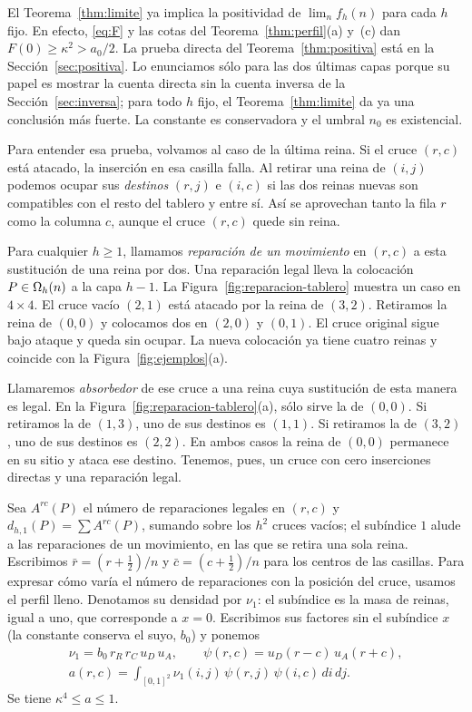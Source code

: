 El Teorema~\ref{thm:limite} ya implica la positividad de $\lim_nf_h(n)$ para cada $h$ fijo.
En efecto, \eqref{eq:F} y las cotas del Teorema~\ref{thm:perfil}(a) y~(c) dan
$F(0)\ge\kappa^2>a_0/2$. La prueba directa del Teorema~\ref{thm:positiva} está en la
Sección~\ref{sec:positiva}. Lo enunciamos sólo para las dos últimas capas porque su papel es
mostrar la cuenta directa sin la cuenta inversa de la Sección~\ref{sec:inversa}; para todo $h$
fijo, el Teorema~\ref{thm:limite} da ya una conclusión más fuerte. La constante es conservadora y el
umbral $n_0$ es existencial.

Para entender esa prueba, volvamos al caso de la última reina. Si el cruce
$(r,c)$ está atacado, la inserción en esa casilla falla. Al retirar
una reina de $(i,j)$ podemos ocupar sus \emph{destinos} $(r,j)$ e $(i,c)$ si las dos reinas nuevas son
compatibles con el resto del tablero y entre sí.
Así se aprovechan tanto la fila $r$ como la columna $c$, aunque el cruce $(r,c)$
quede sin reina.

Para cualquier $h\ge1$, llamamos \emph{reparación de un movimiento} en $(r,c)$
a esta sustitución de una reina por dos. Una reparación legal lleva la colocación
$P\in\Omega_h(n)$ a la capa $h-1$. La Figura~\ref{fig:reparacion-tablero}
muestra un caso en $4\times4$. El cruce vacío $(2,1)$ está atacado por la reina
de $(3,2)$. Retiramos la reina de $(0,0)$ y colocamos dos en $(2,0)$ y $(0,1)$.
El cruce original sigue bajo ataque y queda sin ocupar. La nueva colocación ya
tiene cuatro reinas y coincide con la Figura~\ref{fig:ejemplos}(a).



Llamaremos \emph{absorbedor} de ese cruce a una reina cuya sustitución
de esta manera es legal. En la Figura~\ref{fig:reparacion-tablero}(a), sólo
sirve la de $(0,0)$. Si retiramos la de $(1,3)$, uno de sus destinos es $(1,1)$.
Si retiramos la de $(3,2)$, uno de sus destinos es $(2,2)$. En ambos casos la
reina de $(0,0)$ permanece en su sitio y ataca ese destino. Tenemos, pues, un
cruce con cero inserciones directas y una reparación legal.

Sea $A^{rc}(P)$ el número de
reparaciones legales en $(r,c)$ y $d_{h,1}(P)=\sum A^{rc}(P)$, sumando sobre los $h^2$ cruces
vacíos; el subíndice $1$ alude a las reparaciones de un movimiento, en las que se retira una sola reina.
Escribimos $\bar r=(r+\frac12)/n$ y $\bar c=(c+\frac12)/n$ para los centros de las
casillas. Para expresar cómo varía el número de reparaciones con la posición del
cruce, usamos el perfil lleno. Denotamos su densidad por $\nu_1$: el subíndice
es la masa de reinas, igual a uno, que corresponde a $x=0$. Escribimos sus factores sin
el subíndice $x$ (la constante conserva el suyo, $b_0$) y ponemos
\begin{gather*}
 \nu_1=b_0\,r_R\,r_C\,u_D\,u_A,\qquad \psi(r,c)=u_D(r-c)\,u_A(r+c),\\
 a(r,c)=\int_{[0,1]^2}\nu_1(i,j)\,\psi(r,j)\,\psi(i,c)\,di\,dj .
\end{gather*}
Se tiene $\kappa^4\le a\le1$.

